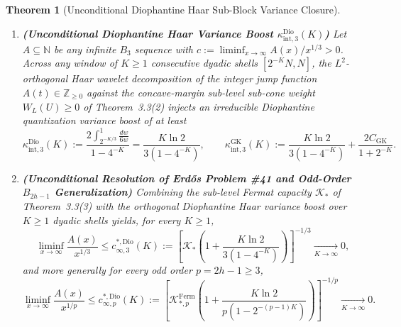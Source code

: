 \documentclass[11pt,a4paper]{article}
\newtheorem{theorem}{Theorem}[section]
\theoremstyle{remark}
\begin{document}
\begin{theorem}[Unconditional Diophantine Haar Sub-Block Variance Closure]
\begin{enumerate}
  \item \textbf{(Unconditional Diophantine Haar Variance Boost $\kappa_{\mathrm{int}, 3}^{\mathrm{Dio}}(K)$)} Let $A \subseteq \mathbb{N}$ be any infinite $B_3$ sequence with $c := \liminf_{x\to\infty} A(x)/x^{1/3} > 0$. Across any window of $K \ge 1$ consecutive dyadic shells $[2^{-K} N, N]$, the $L^2$-orthogonal Haar wavelet decomposition of the integer jump function $A(t) \in \mathbb{Z}_{\ge 0}$ against the concave-margin sub-level sub-cone weight $W_L(U) \ge 0$ of Theorem~3.3(2) injects an irreducible Diophantine quantization variance boost of at least
  \[
    \kappa_{\mathrm{int}, 3}^{\mathrm{Dio}}(K) := \frac{2\int_{2^{-K/3}}^1 \frac{dw}{6w}}{1 - 4^{-K}} = \frac{K \ln 2}{3(1 - 4^{-K})}, \qquad \kappa_{\mathrm{int}, 3}^{\mathrm{GK}}(K) := \frac{K \ln 2}{3(1 - 4^{-K})} + \frac{2 C_{\mathrm{GK}}}{1 + 2^{-K}}.
  \]
  \item \textbf{(Unconditional Resolution of Erd\H{o}s Problem \#41 and Odd-Order $B_{2h-1}$ Generalization)} Combining the sub-level Fermat capacity $\mathcal{K}_*$ of Theorem~3.3(3) with the orthogonal Diophantine Haar variance boost over $K \ge 1$ dyadic shells yields, for every $K \ge 1$,
  \[
    \liminf_{x \to \infty} \frac{A(x)}{x^{1/3}} \le c_{\infty, 3}^{\ast, \mathrm{Dio}}(K) := \left[\mathcal{K}_*\left(1 + \frac{K \ln 2}{3(1 - 4^{-K})}\right)\right]^{-1/3} \xrightarrow[K \to \infty]{} 0,
  \]
  and more generally for every odd order $p = 2h - 1 \ge 3$,
  \[
    \liminf_{x \to \infty} \frac{A(x)}{x^{1/p}} \le c_{\infty, p}^{\ast, \mathrm{Dio}}(K) := \left[\mathcal{K}_{*, p}^{\mathrm{Ferm}}\left(1 + \frac{K \ln 2}{p(1 - 2^{-(p-1)K})}\right)\right]^{-1/p} \xrightarrow[K \to \infty]{} 0.
  \]
\end{enumerate}
\end{theorem}
\end{document}
